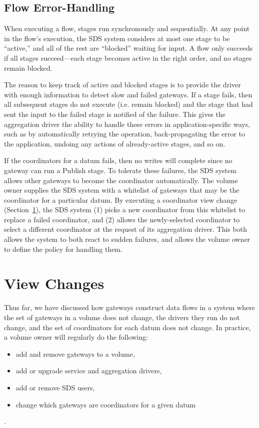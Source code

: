 \subsection{Flow Error-Handling}

When executing a flow, stages run synchronously and sequentially.  At any point in the flow's execution, the
SDS system considers at most one stage to be ``active,'' and all of the rest are
``blocked'' waiting for input.  A flow only succeeds if all stages
succeed---each stage becomes active in the right order, and no stages remain
blocked.

The reason to keep track of active and blocked stages is to provide
the driver with enough information to detect slow and failed gateways.
If a stage fails, then all subsequent stages do not execute (i.e. remain
blocked) and the stage that had sent the input to the
failed stage is notified of the failure.  This gives the aggregation driver
the ability to handle these errors in application-specific ways, such as by
automatically retrying the operation, back-propagating the error to the application, 
undoing any actions of already-active stages, and so on.

If the coordinators for a datum fails, then no writes will complete since no
gateway can run a Publish stage.  To
tolerate these failures, the SDS system allows other gateways to
become the coordinator automatically.  The volume owner supplies the SDS system with a
whitelist of gateways that may be the coordinator for a particular datum.
By executing a coordinator view change (Section~\ref{sec:view-changes}), the SDS
system (1) picks a new coordinator from this
whitelist to replace a failed coordinator, and (2) allows the newly-selected coordinator
to select a different coordinator at the request of its aggregation driver.
This both allows the system to both react to sudden failures, and allows the volume
owner to define the policy for handling them.

\section{View Changes}
\label{sec:view-changes}

Thus far, we have discussed how gateways construct data flows in a system
where the set of gateways in a volume does not change, the
drivers they run do not change, and the set of coordinators for each datum does
not change.  In practice, a volume owner will regularly do the following:

\begin{itemize}
   \item add and remove gateways to a volume,
   \item add or upgrade service and aggregation drivers,
   \item add or remove SDS users,
   \item change which gateways are coordinators for a given datum
\end{itemize}.

